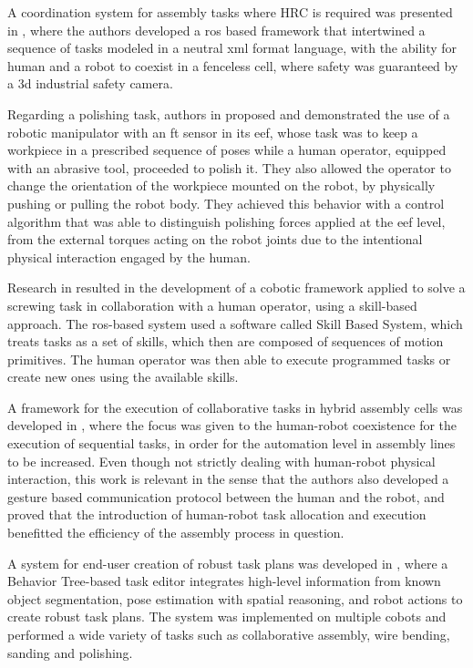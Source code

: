 \par A coordination system for assembly tasks where HRC is required was presented in \cite{colab.assembly}, where the authors developed a \ac{ros} based framework that intertwined a sequence of tasks modeled in a neutral \acs{xml} format language, with the ability for human and a robot to coexist in a fenceless cell, where safety was guaranteed by a \acs{3d} industrial safety camera.

\par Regarding a polishing task, authors in \cite{colab.polishing} proposed and demonstrated the use of a robotic manipulator with an \ac{ft} sensor in its \ac{eef}, whose task was to keep a workpiece in a prescribed sequence of poses while a human operator, equipped with an abrasive tool, proceeded to polish it. They also allowed the operator to change the orientation of the workpiece mounted on the robot, by physically pushing or pulling the robot body. They achieved this behavior with a control algorithm that was able to distinguish polishing forces applied at the \ac{eef} level, from the external torques acting on the robot joints due to the intentional physical interaction engaged by the human.

\par Research in \cite{colab.skill} resulted in the development of a cobotic framework applied to solve a screwing task in collaboration with a human operator, using a skill-based approach. The \ac{ros}-based system used a software called Skill Based System, which treats tasks as a set of skills, which then are composed of sequences of motion primitives. The human operator was then able to execute programmed tasks or create new ones using the available skills.

\par A framework for the execution of collaborative tasks in hybrid assembly cells was developed in \cite{colab.assembly.cell}, where the focus was given to the human-robot coexistence for the execution of sequential tasks, in order for the automation level in assembly lines to be increased. Even though not strictly dealing with human-robot physical interaction, this work is relevant in the sense that the authors also developed a gesture based communication protocol between the human and the robot, and proved that the introduction of human-robot task allocation and execution benefitted the efficiency of the assembly process in question.

\par A system for end-user creation of robust task plans was developed in \cite{colab.costar}, where a Behavior Tree-based task editor integrates high-level information from known object segmentation, pose estimation with spatial reasoning, and robot actions to create robust task plans. The system was implemented on multiple cobots and performed a wide variety of tasks such as collaborative assembly, wire bending, sanding and polishing.

